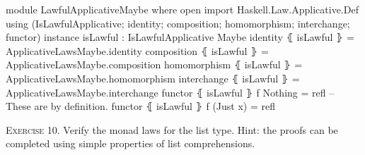 \documentclass{article}
\begin{document}
\begin{code}
module LawfulApplicativeMaybe where
  open import Haskell.Law.Applicative.Def
    using (IsLawfulApplicative; identity; composition;
      homomorphism; interchange; functor)
  instance
    isLawful : IsLawfulApplicative Maybe
    identity ⦃ isLawful ⦄ = ApplicativeLawsMaybe.identity
    composition ⦃ isLawful ⦄ = ApplicativeLawsMaybe.composition
    homomorphism ⦃ isLawful ⦄ = ApplicativeLawsMaybe.homomorphism
    interchange ⦃ isLawful ⦄ = ApplicativeLawsMaybe.interchange
    functor ⦃ isLawful ⦄ f Nothing = refl -- These are by definition.
    functor ⦃ isLawful ⦄ f (Just x) = refl
\end{code}

\noindent
\textsc{Exercise 10.} Verify the monad laws for the list type. Hint: the proofs can be completed using simple properties of list comprehensions.
\end{document}
